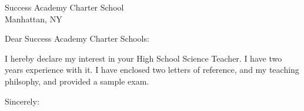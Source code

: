 \documentclass[
    jphafner,
    fontsize=11pt,
    foldmarks=false,
    pagenumber=false,
    addrfield=true,
]{scrlttr2}
\date{\today}
\begin{document}
\begin{letter}{Success Academy Charter School \\ Manhattan, NY} %
\opening{Dear Success Academy Charter  Schools:}


I hereby declare my interest in your High School Science Teacher.
I have two years experience with it.
I have enclosed two letters of reference,
    and my teaching philsophy,
    and provided a sample exam.





\closing{Sincerely:}
\end{letter}
\end{document}
